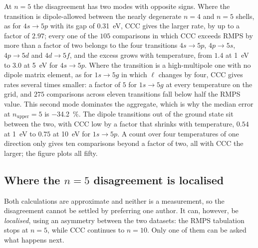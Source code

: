 At $n=5$ the disagreement has two modes with opposite signs. Where the
transition is dipole-allowed between the nearly degenerate $n=4$ and $n=5$
shells, as for $4s \to 5p$ with its gap of \SI{0.31}{\electronvolt}, CCC gives
the larger rate, by up to a factor of $2.97$; every one of the $105$
comparisons in which CCC exceeds RMPS by more than a factor of two belongs to
the four transitions $4s \to 5p$, $4p \to 5s$, $4p \to 5d$ and $4d \to 5f$,
and the excess grows with temperature, from $1.4$ at \SI{1}{\electronvolt} to
$3.0$ at \SI{5}{\electronvolt} for $4s \to 5p$. Where the transition is a
high-multipole one with no dipole matrix element, as for $1s \to 5g$ in which
$\ell$ changes by four, CCC gives rates several times smaller: a factor of $5$
for $1s \to 5g$ at every temperature on the grid, and $275$ comparisons across
eleven transitions fall below half the RMPS value. This second mode dominates
the aggregate, which is why the median error at $n_{\text{upper}}=5$ is
\SI{-34.2}{\percent}. The dipole transitions out of the ground state sit
between the two, with CCC low by a factor that shrinks with temperature,
$0.54$ at \SI{1}{\electronvolt} to $0.75$ at \SI{10}{\electronvolt} for
$1s \to 5p$. A count over four temperatures of one direction only gives ten
comparisons beyond a factor of two, all with CCC the larger; the figure plots
all fifty.

\subsection{Where the \texorpdfstring{$n=5$}{n=5} disagreement is localised}
\label{sec:n5_anomaly}

Both calculations are approximate and neither is a measurement, so the
disagreement cannot be settled by preferring one author. It can, however, be
\emph{localised}, using an asymmetry between the two datasets: the RMPS
tabulation stops at $n=5$, while CCC continues to $n=10$. Only one of them can
be asked what happens next.

